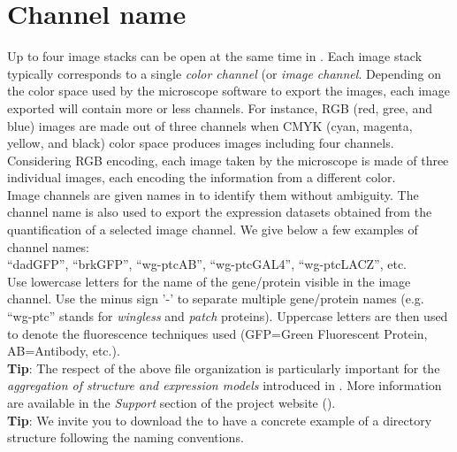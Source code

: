 \section{Channel name} \label{convention_experiment_channel_names}
Up to four image stacks can be open at the same time in \wingj. Each image stack typically corresponds to a single \textit{color channel} (or \textit{image channel}. Depending on the color space used by the microscope software to export the images, each image exported will contain more or less channels. For instance, RGB (red, gree, and blue) images are made out of three channels when CMYK (cyan, magenta, yellow, and black) color space produces images including four channels. Considering RGB encoding, each image taken by the microscope is made of three individual images, each encoding the information from a different color.\\

Image channels are given names in \wingj to identify them without ambiguity. The channel name is also used to export the expression datasets obtained from the quantification of a selected image channel. We give below a few examples of channel names:\\

``dadGFP'', ``brkGFP'', ``wg-ptcAB'', ``wg-ptcGAL4'', ``wg-ptcLACZ'', etc.\\

Use lowercase letters for the name of the gene/protein visible in the image channel. Use the minus sign '-' to separate multiple gene/protein names (e.g. ``wg-ptc'' stands for \textit{wingless} and \textit{patch} proteins). Uppercase letters are then used to denote the fluorescence techniques used (GFP=Green Fluorescent Protein, AB=Antibody, etc.).\\

\textbf{Tip}: The respect of the above file organization is particularly important for the \textit{aggregation of structure and expression models} introduced in . More information are available in the \textit{Support} section of the project website (\wingjShortUrl).\\

\textbf{Tip}: We invite you to download the \wingjBenchmarkImages to have a concrete example of a directory structure following the \wingj naming conventions.

% 

